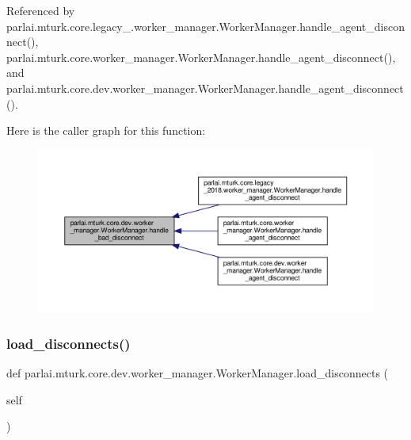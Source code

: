 Referenced by parlai.\+mturk.\+core.\+legacy\+\_.\+worker\+\_\+manager.\+Worker\+Manager.\+handle\+\_\+agent\+\_\+disconnect(), parlai.\+mturk.\+core.\+worker\+\_\+manager.\+Worker\+Manager.\+handle\+\_\+agent\+\_\+disconnect(), and parlai.\+mturk.\+core.\+dev.\+worker\+\_\+manager.\+Worker\+Manager.\+handle\+\_\+agent\+\_\+disconnect().

Here is the caller graph for this function\+:
\nopagebreak
\begin{figure}[H]
\begin{center}
\leavevmode
\includegraphics[width=350pt]{classparlai_1_1mturk_1_1core_1_1dev_1_1worker__manager_1_1WorkerManager_ae527be446b326d4252304cf89850aff8_icgraph}
\end{center}
\end{figure}
\mbox{\label{classparlai_1_1mturk_1_1core_1_1dev_1_1worker__manager_1_1WorkerManager_a1d1185d97ee3a467a33a1872a316ea2d}} 
\subsubsection{\texorpdfstring{load\+\_\+disconnects()}{load\_disconnects()}}
{\footnotesize\ttfamily def parlai.\+mturk.\+core.\+dev.\+worker\+\_\+manager.\+Worker\+Manager.\+load\+\_\+disconnects (\begin{DoxyParamCaption}\item[{}]{self }\end{DoxyParamCaption})}

